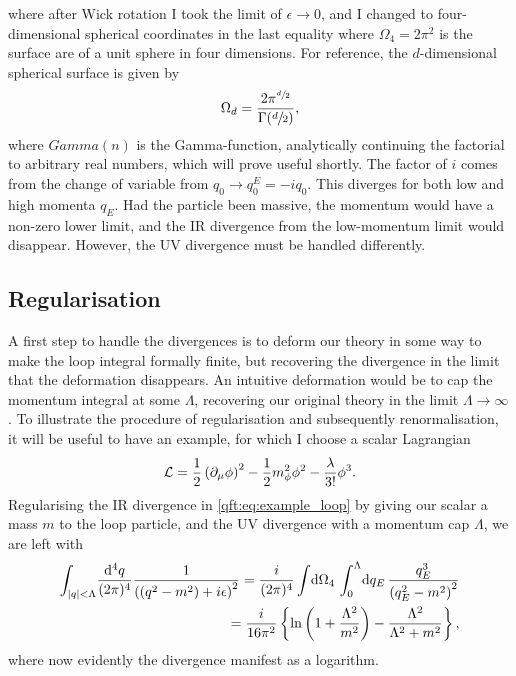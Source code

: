 \documentclass[../main.tex]{subfiles}
\begin{document}
where after Wick rotation I took the limit of \(\epsilon \to 0\), and I changed to four-dimensional spherical coordinates in the last equality where \(\Omega_4 = 2\pi^2\) is the surface are of a unit sphere in four dimensions.
For reference, the \(d\)-dimensional spherical surface is given by
\begin{equation}
  \Omega_d = \frac{2\pi^{\sfrac{d}{2}}}{\Gamma(\sfrac{d}{2})},
\end{equation}
where \(Gamma(n)\) is the Gamma-function, analytically continuing the factorial to arbitrary real numbers, which will prove useful shortly.
The factor of \(i\) comes from the change of variable from \(q_0 \to q^E_0 = -iq_0\).
This diverges for both low and high momenta \(q_E\).
Had the particle been massive, the momentum would have a non-zero lower limit, and the IR divergence from the low-momentum limit would disappear.
However, the UV divergence must be handled differently.


\subsection{Regularisation}
A first step to handle the divergences is to deform our theory in some way to
make the loop integral formally finite, but recovering the divergence in the
limit that the deformation disappears. An intuitive deformation would be to cap
the momentum integral at some \(\Lambda\), recovering our original theory in
the limit \(\Lambda \to \infty\). To illustrate the procedure of regularisation
and subsequently renormalisation, it will be useful to have an example, for
which I choose a scalar Lagrangian
\begin{equation}
  \label{qft:eq:example_lagrangian}
  \L = \frac{1}{2} \pclosed{\partial_\mu\phi}^2 - \frac{1}{2}m_\phi^2 \phi^2 - \frac{\lambda}{3!} \phi^3.
\end{equation}
Regularising the IR divergence in \cref{qft:eq:example_loop} by giving our scalar a mass \(m\) to the loop particle, and the UV divergence with a momentum cap \(\Lambda\), we are left with
\begin{align}
  \label{qft:eq:cut-off_loop_example}
  \nonumber
  \int_{\abs{q} < \Lambda}\! \frac{\mathrm{d}^4q}{(2\pi)^4}
  \frac{1}{\pclosed{(q^2-m^2)+i\epsilon}^2} = \frac{i}{(2\pi)^4}
  \integral{\Omega_4} \integral[_0^\Lambda]{q_E} \frac{q_E^3}{\pclosed{q_E^2
      -
  m^2}^2} \\
  = \frac{i}{16\pi^2} \cclosed{\ln\pclosed{1 + \frac{\Lambda^2}{m^2}} -
    \frac{\Lambda^2}{\Lambda^2 + m^2}},
\end{align}
where now evidently the divergence manifest as a logarithm.
\medskip
\end{document}

